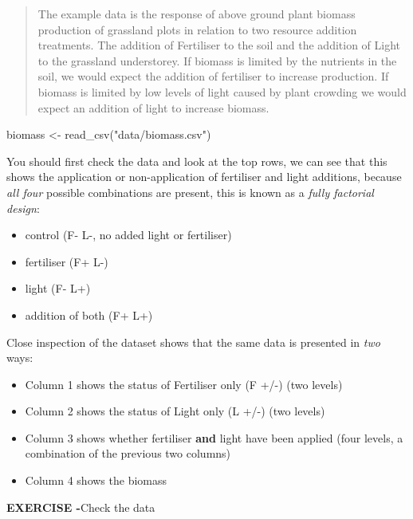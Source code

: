 \documentclass[
]{book}
\newenvironment{Shaded}{\begin{snugshade}}{\end{snugshade}}
\newcommand{\FunctionTok}[1]{\textcolor[rgb]{0.00,0.00,0.00}{#1}}
\newcommand{\NormalTok}[1]{#1}
\newcommand{\OtherTok}[1]{\textcolor[rgb]{0.56,0.35,0.01}{#1}}
\newcommand{\StringTok}[1]{\textcolor[rgb]{0.31,0.60,0.02}{#1}}
\begin{document}
\begin{quote}
The example data is the response of above ground plant biomass production of grassland plots in relation to two resource addition treatments. The addition of Fertiliser to the soil and the addition of Light to the grassland understorey. If biomass is limited by the nutrients in the soil, we would expect the addition of fertiliser to increase production. If biomass is limited by low levels of light caused by plant crowding we would expect an addition of light to increase biomass.
\end{quote}

\begin{Shaded}
\begin{Highlighting}[]
\NormalTok{biomass }\OtherTok{\textless{}{-}} \FunctionTok{read\_csv}\NormalTok{(}\StringTok{"data/biomass.csv"}\NormalTok{)}
\end{Highlighting}
\end{Shaded}

You should first check the data and look at the top rows, we can see that this shows the application or non-application of fertiliser and light additions, because \emph{all four} possible combinations are present, this is known as a \emph{fully factorial design}:

\begin{itemize}
\item
  control (F- L-, no added light or fertiliser)
\item
  fertiliser (F+ L-)
\item
  light (F- L+)
\item
  addition of both (F+ L+)
\end{itemize}

Close inspection of the dataset shows that the same data is presented in \emph{two} ways:

\begin{itemize}
\item
  Column 1 shows the status of Fertiliser only (F +/-) (two levels)
\item
  Column 2 shows the status of Light only (L +/-) (two levels)
\item
  Column 3 shows whether fertiliser \textbf{and} light have been applied (four levels, a combination of the previous two columns)
\item
  Column 4 shows the biomass
\end{itemize}

\textbf{EXERCISE -}Check the data
\end{document}
